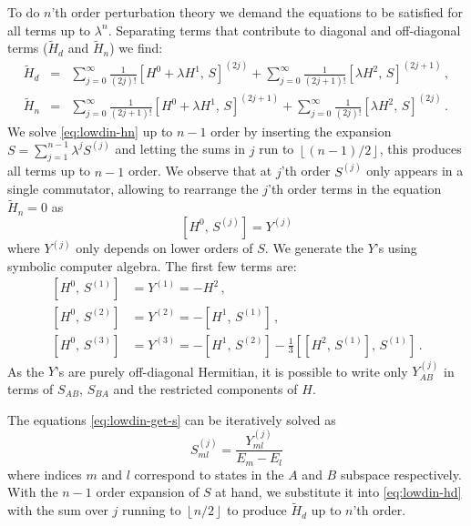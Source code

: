 \documentclass[10pt, onecolumn, aps, prb, superscriptaddress, floatfix, showpacs, notitlepage]{revtex4-1}
\begin{document}
To do $n$'th order perturbation theory we demand the equations to be satisfied for all terms up to $\lambda^n$.
Separating terms that contribute to diagonal and off-diagonal terms ($\tilde{H}_{d}$ and $\tilde{H}_{n}$) we find:
\begin{subequations}
\begin{eqnarray}
\label{eq:lowdin-hd}
\tilde{H}_{d}
    &=& \sum_{j=0}^{\infty}\frac{1}{(2j)!} [H^0 + \lambda H^1,\,S]^{(2j)}
    + \sum_{j=0}^{\infty}\frac{1}{(2j+1)!} [\lambda H^2,\,S]^{(2j+1)}\,,\\
\label{eq:lowdin-hn}
\tilde{H}_{n}
    &=& \sum_{j=0}^{\infty}\frac{1}{(2j+1)!} [H^0 + \lambda H^1,\,S]^{(2j+1)}
    + \sum_{j=0}^{\infty}\frac{1}{(2j)!} [\lambda H^2,\,S]^{(2j)}\,.
\end{eqnarray}
\end{subequations}
We solve \eqref{eq:lowdin-hn} up to $n-1$ order by inserting the expansion $S = \sum_{j = 1}^{n-1} \lambda^j S^{(j)}$ and letting the sums in $j$ run to $\left\lfloor (n-1)/2 \right\rfloor$, this produces all terms up to $n-1$ order.
We observe that at $j$'th order $S^{(j)}$ only appears in a single commutator, allowing to rearrange the $j$'th order terms in the equation $\tilde{H}_{n} = 0$ as
\begin{equation}
{[H^0,\,S^{(j)}]} = Y^{(j)}
\end{equation}
where $Y^{(j)}$ only depends on lower orders of $S$.
We generate the $Y$'s using symbolic computer algebra.
The first few terms are:
\begin{subequations}
\label{eq:lowdin-get-s}
\begin{align}
{[H^0,\,S^{(1)}]} &= Y^{(1)} = -H^2\,,\\
{[H^0,\,S^{(2)}]} &= Y^{(2)} = -[H^1,\,S^{(1)}]\,,\\
{[H^0,\,S^{(3)}]} &= Y^{(3)} = -[H^1,\,S^{(2)}] - \frac{1}{3} [[H^2,\,S^{(1)}],\,S^{(1)}]\,.
\end{align}
\end{subequations}
As the $Y$'s are purely off-diagonal Hermitian, it is possible to write only $Y^{(j)}_{AB}$ in terms of $S_{AB}$, $S_{BA}$ and the restricted components of $H$.

The equations \eqref{eq:lowdin-get-s} can be iteratively solved as
\begin{equation}
\label{eq:lowdin-s-from-y}
S^{(j)}_{ml} = \frac{Y^{(j)}_{ml}}{E_m - E_l}
\end{equation}
where indices $m$ and $l$ correspond to states in the $A$ and $B$ subspace respectively.
With the $n-1$ order expansion of $S$ at hand, we substitute it into \eqref{eq:lowdin-hd} with the sum over $j$ running to $\left\lfloor n/2 \right\rfloor$ to produce $\tilde{H}_{d}$ up to $n$'th order.
\end{document}
